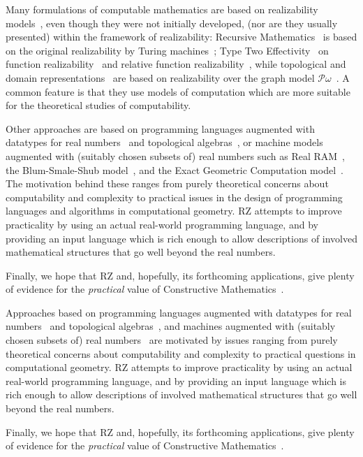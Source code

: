 Many formulations of computable mathematics are based on realizability
models~\cite{Bauer:00}, even though they were not initially developed,
(nor are they usually presented) within the framework of realizability:
Recursive Mathematics~\cite{ershov98:_handb_recur_mathem} is based on
the original realizability by Turing machines~\cite{KleeneSC:intint};
Type Two Effectivity~\cite{Wei00} on function
realizability~\cite{KleeneSC:fouim} and relative function
realizability~\cite{BirkedalL:devttc}, while topological and domain
representations~\cite{Bla97a,Bauer:Birkedal:Scott:98} are based on
realizability over the graph model
$\mathcal{P}\omega$~\cite{ScottD:dattl}. A common feature is
that they use models of computation which are more suitable for the
theoretical studies of computability. 

\iflong
Other approaches are based on programming languages augmented with
datatypes for real numbers~\cite{Escardo:97,marcial-romero04:_seman}
and topological algebras~\cite{TZ98}, or machine models augmented with
(suitably chosen subsets of) real numbers such as Real
RAM~\cite{borodin75}, the Blum-Smale-Shub
model~\cite{blum98:_compl_real_comput}, and the Exact Geometric
Computation model~\cite{yap06:_theor_real_comput_egc}. The motivation
behind these ranges from purely theoretical concerns about
computability and complexity to practical issues in the design of
programming languages and algorithms in computational geometry. RZ
attempts to improve practicality by using an actual
real-world programming language, and by providing an input language
which is rich enough to allow descriptions of involved mathematical
structures that go well beyond the real numbers.

Finally, we hope that RZ and, hopefully, its forthcoming applications,
give plenty of evidence for the \emph{practical} value of Constructive
Mathematics~\cite{Bishop:Bridges:85}.

\else %

Approaches based on programming languages augmented with datatypes for
real numbers~\cite{escardo97:_pcf,marcial-romero04:_seman} and topological
algebras~\cite{TZ98}, and machines augmented with (suitably chosen
subsets of) real
numbers~\cite{borodin75,blum98:_compl_real_comput,yap06:_theor_real_comput_egc}
are motivated by issues ranging from purely theoretical concerns about
computability and complexity to practical questions in computational
geometry. RZ attempts to improve practicality by using an actual
real-world programming language, and by providing an input language
which is rich enough to allow descriptions of involved mathematical
structures that go well beyond the real numbers.

Finally, we hope that RZ and, hopefully, its forthcoming applications,
give plenty of evidence for the \emph{practical} value of Constructive
Mathematics~\cite{Bishop:Bridges:85}.

\fi



